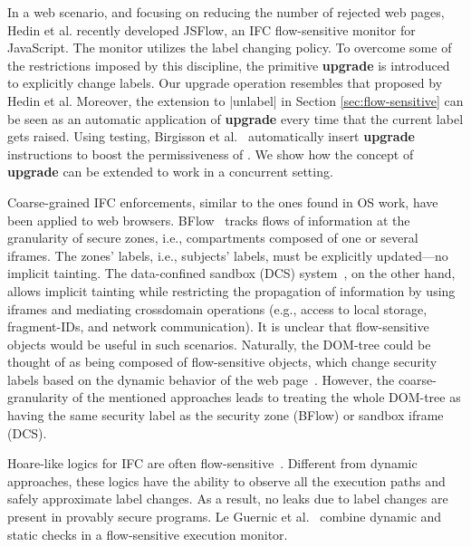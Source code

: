 In a web scenario, and focusing on reducing the number of rejected web pages,
Hedin et al. \citep{Hedin13} recently developed JSFlow, an IFC flow-sensitive
monitor for JavaScript. The monitor utilizes the {\nsu} label changing
policy. To overcome some of the restrictions imposed by this discipline, the
primitive \textbf{upgrade} is introduced to explicitly change labels. Our
upgrade operation resembles that proposed by Hedin et al. Moreover, the
extension to |unlabel| in Section \ref{sec:flow-sensitive} can be seen as an
automatic application of \textbf{upgrade} every time that the current label gets
raised. Using testing, Birgisson et al.~\citep{Arnar2012} automatically insert
\textbf{upgrade} instructions to boost the permissiveness of {\nsu}. We show how
the concept of \textbf{upgrade} can be extended to work in a concurrent setting.



Coarse-grained IFC enforcements, similar to the ones found in OS work, have been
applied to web browsers. BFlow~\citep{Yip:2009} tracks flows of information at
the granularity of secure zones, i.e., compartments composed of one or several
iframes. The zones' labels, i.e., subjects' labels, must be explicitly updated---no
implicit tainting. The data-confined sandbox (DCS)
system~\citep{conf/esorics/AkhaweLHSS13}, on the other hand, allows implicit
tainting while restricting the propagation of information by using iframes and
mediating crossdomain operations (e.g., access to local storage, fragment-IDs, and
network communication). It is unclear that flow-sensitive objects would be
useful in such scenarios. Naturally, the DOM-tree could be thought of as being
composed of flow-sensitive objects, which change security labels based on the
dynamic behavior of the web page~\citep{Russo:2009}. However, the
coarse-granularity of the mentioned approaches leads to treating the whole DOM-tree
as having the same security label as the security zone (BFlow) or sandbox iframe
(DCS). 

Hoare-like logics for IFC are often
flow-sensitive~\citep[e.g.][]{Amtoft:2006,Nanevski:2011}. Different from dynamic
approaches, these logics have the ability to observe all the execution paths and
safely approximate label changes. As a result, no leaks due to label changes are
present in provably secure programs.
Le Guernic et al.~\citep{LeGuernic:2006,Guernic:2007:ACM} combine dynamic and
static checks in a flow-sensitive execution monitor. 




 



